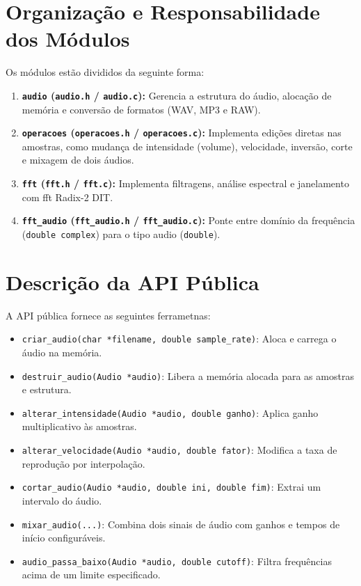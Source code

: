 \documentclass[12pt, a4paper]{article}
\begin{document}
\section{Organização e Responsabilidade dos Módulos}
Os módulos estão divididos da seguinte forma:
\begin{enumerate}
    \item \textbf{\texttt{audio} (\texttt{audio.h} / \texttt{audio.c}):} Gerencia a estrutura do áudio, alocação de memória e conversão de formatos (WAV, MP3 e RAW).
    \item \textbf{\texttt{operacoes} (\texttt{operacoes.h} / \texttt{operacoes.c}):} Implementa edições diretas nas amostras, como mudança de intensidade (volume), velocidade, inversão, corte e mixagem de dois áudios.
    \item \textbf{\texttt{fft} (\texttt{fft.h} / \texttt{fft.c}):} Implementa filtragens, análise espectral e janelamento com fft Radix-2 DIT.
    \item \textbf{\texttt{fft\_audio} (\texttt{fft\_audio.h} / \texttt{fft\_audio.c}):} Ponte entre domínio da frequência (\texttt{double complex}) para o tipo audio (\texttt{double}).
\end{enumerate}

\section{Descrição da API Pública}
A API pública fornece as seguintes ferrametnas:
\begin{itemize}
    \item \texttt{criar\_audio(char *filename, double sample\_rate)}: Aloca e carrega o áudio na memória.
    \item \texttt{destruir\_audio(Audio *audio)}: Libera a memória alocada para as amostras e estrutura.
    \item \texttt{alterar\_intensidade(Audio *audio, double ganho)}: Aplica ganho multiplicativo às amostras.
    \item \texttt{alterar\_velocidade(Audio *audio, double fator)}: Modifica a taxa de reprodução por interpolação.
    \item \texttt{cortar\_audio(Audio *audio, double ini, double fim)}: Extrai um intervalo do áudio.
    \item \texttt{mixar\_audio(...)}: Combina dois sinais de áudio com ganhos e tempos de início configuráveis.
    \item \texttt{audio\_passa\_baixo(Audio *audio, double cutoff)}: Filtra frequências acima de um limite especificado.
\end{itemize}
\end{document}
